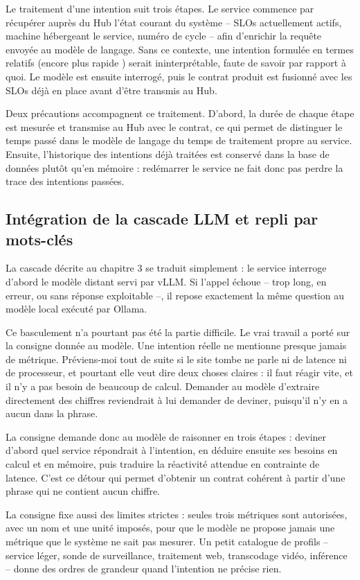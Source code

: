 Le traitement d'une intention suit trois étapes. Le service commence par récupérer auprès du Hub l'état courant du système -- SLOs actuellement actifs, machine hébergeant le service, numéro de cycle -- afin d'enrichir la requête envoyée au modèle de langage. Sans ce contexte, une intention formulée en termes relatifs (\og encore plus rapide \fg) serait ininterprétable, faute de savoir par rapport à quoi. Le modèle est ensuite interrogé, puis le contrat produit est fusionné avec les SLOs déjà en place avant d'être transmis au Hub.

Deux précautions accompagnent ce traitement. D'abord, la durée de chaque étape est mesurée et transmise au Hub avec le contrat, ce qui permet de distinguer le temps passé dans le modèle de langage du temps de traitement propre au service. Ensuite, l'historique des intentions déjà traitées est conservé dans la base de données plutôt qu'en mémoire : redémarrer le service ne fait donc pas perdre la trace des intentions passées.

\subsection{Intégration de la cascade LLM et repli par mots-clés}

La cascade décrite au chapitre 3 se traduit simplement : le service interroge d'abord le modèle distant servi par vLLM. Si l'appel échoue -- trop long, en erreur, ou sans réponse exploitable --, il repose exactement la même question au modèle local exécuté par Ollama.

Ce basculement n'a pourtant pas été la partie difficile. Le vrai travail a porté sur la consigne donnée au modèle. Une intention réelle ne mentionne presque jamais de métrique. \og Préviens-moi tout de suite si le site tombe \fg ne parle ni de latence ni de processeur, et pourtant elle veut dire deux choses claires : il faut réagir vite, et il n'y a pas besoin de beaucoup de calcul. Demander au modèle d'extraire directement des chiffres reviendrait à lui demander de deviner, puisqu'il n'y en a aucun dans la phrase.

La consigne demande donc au modèle de raisonner en trois étapes : deviner d'abord quel service répondrait à l'intention, en déduire ensuite ses besoins en calcul et en mémoire, puis traduire la réactivité attendue en contrainte de latence. C'est ce détour qui permet d'obtenir un contrat cohérent à partir d'une phrase qui ne contient aucun chiffre.

La consigne fixe aussi des limites strictes : seules trois métriques sont autorisées, avec un nom et une unité imposés, pour que le modèle ne propose jamais une métrique que le système ne sait pas mesurer. Un petit catalogue de profils -- service léger, sonde de surveillance, traitement web, transcodage vidéo, inférence -- donne des ordres de grandeur quand l'intention ne précise rien.


